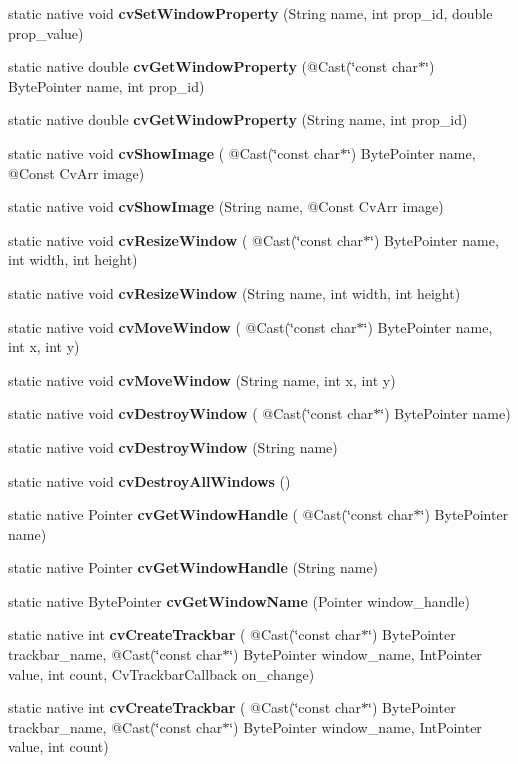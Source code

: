 \begin{DoxyCompactItemize}
static native void {\bfseries cv\+Set\+Window\+Property} (String name, int prop\+\_\+id, double prop\+\_\+value)
\item 
static native double {\bfseries cv\+Get\+Window\+Property} (@Cast(\char`\"{}const char$\ast$\char`\"{}) Byte\+Pointer name, int prop\+\_\+id)
\item 
static native double {\bfseries cv\+Get\+Window\+Property} (String name, int prop\+\_\+id)
\item 
static native void {\bfseries cv\+Show\+Image} ( @Cast(\char`\"{}const char$\ast$\char`\"{}) Byte\+Pointer name, @Const Cv\+Arr image)
\item 
static native void {\bfseries cv\+Show\+Image} (String name, @Const Cv\+Arr image)
\item 
static native void {\bfseries cv\+Resize\+Window} ( @Cast(\char`\"{}const char$\ast$\char`\"{}) Byte\+Pointer name, int width, int height)
\item 
static native void {\bfseries cv\+Resize\+Window} (String name, int width, int height)
\item 
static native void {\bfseries cv\+Move\+Window} ( @Cast(\char`\"{}const char$\ast$\char`\"{}) Byte\+Pointer name, int x, int y)
\item 
static native void {\bfseries cv\+Move\+Window} (String name, int x, int y)
\item 
static native void {\bfseries cv\+Destroy\+Window} ( @Cast(\char`\"{}const char$\ast$\char`\"{}) Byte\+Pointer name)
\item 
static native void {\bfseries cv\+Destroy\+Window} (String name)
\item 
static native void {\bfseries cv\+Destroy\+All\+Windows} ()
\item 
static native Pointer {\bfseries cv\+Get\+Window\+Handle} ( @Cast(\char`\"{}const char$\ast$\char`\"{}) Byte\+Pointer name)
\item 
static native Pointer {\bfseries cv\+Get\+Window\+Handle} (String name)
\item 
static native Byte\+Pointer {\bfseries cv\+Get\+Window\+Name} (Pointer window\+\_\+handle)
\item 
static native int {\bfseries cv\+Create\+Trackbar} ( @Cast(\char`\"{}const char$\ast$\char`\"{}) Byte\+Pointer trackbar\+\_\+name, @Cast(\char`\"{}const char$\ast$\char`\"{}) Byte\+Pointer window\+\_\+name, Int\+Pointer value, int count, Cv\+Trackbar\+Callback on\+\_\+change)
\item 
static native int {\bfseries cv\+Create\+Trackbar} ( @Cast(\char`\"{}const char$\ast$\char`\"{}) Byte\+Pointer trackbar\+\_\+name, @Cast(\char`\"{}const char$\ast$\char`\"{}) Byte\+Pointer window\+\_\+name, Int\+Pointer value, int count)

\end{DoxyCompactItemize}
